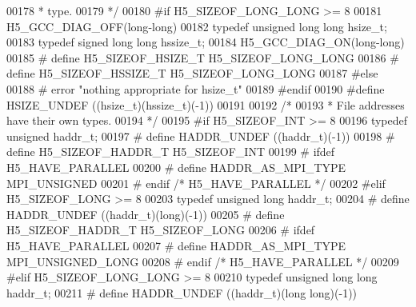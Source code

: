 \begin{DoxyCode}
00178 \textcolor{comment}{ * type.}
00179 \textcolor{comment}{ */}
00180 \textcolor{preprocessor}{#if H5\_SIZEOF\_LONG\_LONG >= 8}
00181 H5\_GCC\_DIAG\_OFF(\textcolor{keywordtype}{long}-\textcolor{keywordtype}{long})
00182 \textcolor{keyword}{typedef} \textcolor{keywordtype}{unsigned} \textcolor{keywordtype}{long} \textcolor{keywordtype}{long}  hsize\_t;
00183 \textcolor{keyword}{typedef} \textcolor{keywordtype}{signed} \textcolor{keywordtype}{long} \textcolor{keywordtype}{long}    hssize\_t;
00184 H5\_GCC\_DIAG\_ON(\textcolor{keywordtype}{long}-\textcolor{keywordtype}{long})
00185 \textcolor{preprocessor}{#       define H5\_SIZEOF\_HSIZE\_T H5\_SIZEOF\_LONG\_LONG}
00186 \textcolor{preprocessor}{#       define H5\_SIZEOF\_HSSIZE\_T H5\_SIZEOF\_LONG\_LONG}
00187 \textcolor{preprocessor}{#else}
00188 \textcolor{preprocessor}{#   error "nothing appropriate for hsize\_t"}
00189 \textcolor{preprocessor}{#endif}
00190 \textcolor{preprocessor}{#define HSIZE\_UNDEF             ((hsize\_t)(hssize\_t)(-1))}
00191 
00192 \textcolor{comment}{/*}
00193 \textcolor{comment}{ * File addresses have their own types.}
00194 \textcolor{comment}{ */}
00195 \textcolor{preprocessor}{#if H5\_SIZEOF\_INT >= 8}
00196     \textcolor{keyword}{typedef} \textcolor{keywordtype}{unsigned}                haddr\_t;
00197 \textcolor{preprocessor}{#   define HADDR\_UNDEF              ((haddr\_t)(-1))}
00198 \textcolor{preprocessor}{#   define H5\_SIZEOF\_HADDR\_T        H5\_SIZEOF\_INT}
00199 \textcolor{preprocessor}{#   ifdef H5\_HAVE\_PARALLEL}
00200 \textcolor{preprocessor}{#       define HADDR\_AS\_MPI\_TYPE    MPI\_UNSIGNED}
00201 \textcolor{preprocessor}{#   endif  }\textcolor{comment}{/* H5\_HAVE\_PARALLEL */}\textcolor{preprocessor}{}
00202 \textcolor{preprocessor}{#elif H5\_SIZEOF\_LONG >= 8}
00203     \textcolor{keyword}{typedef} \textcolor{keywordtype}{unsigned} \textcolor{keywordtype}{long}           haddr\_t;
00204 \textcolor{preprocessor}{#   define HADDR\_UNDEF              ((haddr\_t)(long)(-1))}
00205 \textcolor{preprocessor}{#   define H5\_SIZEOF\_HADDR\_T        H5\_SIZEOF\_LONG}
00206 \textcolor{preprocessor}{#   ifdef H5\_HAVE\_PARALLEL}
00207 \textcolor{preprocessor}{#       define HADDR\_AS\_MPI\_TYPE    MPI\_UNSIGNED\_LONG}
00208 \textcolor{preprocessor}{#   endif  }\textcolor{comment}{/* H5\_HAVE\_PARALLEL */}\textcolor{preprocessor}{}
00209 \textcolor{preprocessor}{#elif H5\_SIZEOF\_LONG\_LONG >= 8}
00210     \textcolor{keyword}{typedef} \textcolor{keywordtype}{unsigned} \textcolor{keywordtype}{long} \textcolor{keywordtype}{long}      haddr\_t;
00211 \textcolor{preprocessor}{#   define HADDR\_UNDEF              ((haddr\_t)(long long)(-1))}

\end{DoxyCode}
